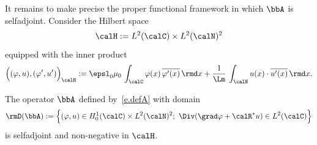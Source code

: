 It remains to make precise the proper functional framework in which $\bbA$ is selfadjoint. Consider the Hilbert space
\[
\calH := L^2(\calC) \times L^2(\calN)^2
\]
equipped with the inner product
\begin{equation}\label{e.def-inner-prod}
\Big((\varphi,u), (\varphi',u') \Big)_\calH :=
\epsl_0 \mu_0 \, \int_\calC \varphi(x) \, \overline{\varphi'(x)} \,\rmd x + \frac{1}{\Lm} \, \int_\calN u(x) \cdot \overline{u'(x)} \,\rmd x.
\end{equation}

\begin{prop}
The operator $\bbA$ defined by~\eqref{e.defA} with domain
\begin{equation}\label{e.def-Dom-A}
\rmD(\bbA) := \Big\{ (\varphi,u) \in H^1_0(\calC) \times L^2(\calN)^2; \
\Div(\grad \varphi + \calR^* u) \in L^2(\calC) \Big\}
\end{equation}
is selfadjoint and non-negative in $\calH$.\label{p.A-selfadjoint}
\end{prop}

